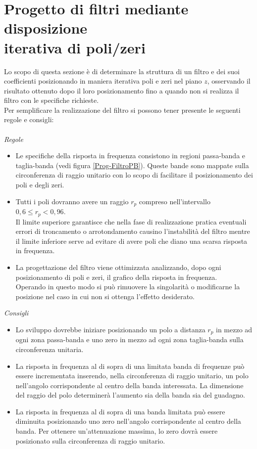 \section{Progetto di filtri mediante disposizione \\iterativa di poli/zeri}
Lo scopo di questa sezione \`e di determinare la struttura di un filtro e dei suoi coefficienti posizionando in maniera iterativa poli e zeri nel piano $z$, osservando il risultato ottenuto dopo il loro posizionamento fino a quando non si realizza il filtro con le specifiche richieste.\\
Per semplificare la realizzazione del filtro si possono tener presente le seguenti regole e consigli:\\
\\
\emph{Regole}
\begin{itemize}
\item Le specifiche della risposta in frequenza consistono in regioni passa-banda e taglia-banda (vedi figura \ref{Prog-FiltroPB}). Queste bande sono mappate sulla circonferenza di raggio unitario con lo scopo di facilitare il posizionamento dei poli e degli zeri.
\item Tutti i poli dovranno avere un raggio $r_p$ compreso nell'intervallo \\$0,6\leq r_p<0,96$.\\
Il limite superiore garantisce che nella fase di realizzazione pratica eventuali errori di troncamento o arrotondamento causino l'instabilit\`a del filtro mentre il limite inferiore serve ad evitare di avere poli che diano una scarsa risposta in frequenza.
\item La progettazione del filtro viene ottimizzata analizzando, dopo ogni posizionamento di poli e zeri, il grafico della risposta in frequenza.\\
Operando in questo modo si pu\`o rimuovere la singolarit\`a o modificarne la posizione nel caso in cui non si ottenga l'effetto desiderato.
\end{itemize}
\emph{Consigli}
\begin{itemize}
\item Lo sviluppo dovrebbe iniziare posizionando un polo a distanza $r_p$ in mezzo ad ogni zona passa-banda e uno zero in mezzo ad ogni zona taglia-banda sulla circonferenza unitaria.
\item La risposta in frequenza al di sopra di una limitata banda di frequenze pu\`o essere incrementata inserendo, nella circonferenza di raggio unitario, un polo nell'angolo corrispondente al centro della banda interessata. La dimensione del raggio del polo determiner\`a l'aumento sia della banda sia del guadagno.
\item La risposta in frequenza al di sopra di una banda limitata pu\`o essere diminuita posizionando uno zero nell'angolo corrispondente al centro della banda. Per ottenere un'attenuazione massima, lo zero dovr\`a essere posizionato sulla circonferenza di raggio unitario.
\end{itemize}

